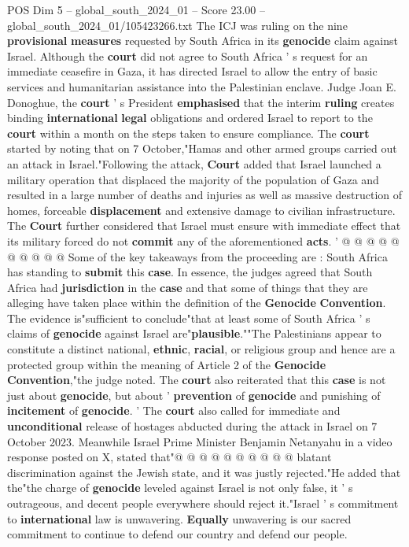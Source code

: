 \begin{textsample}{POS Dim 5 – global\_south\_2024\_01 – Score 23.00 – global\_south\_2024\_01/105423266.txt}  \label{ex:f5_pos_001}
The ICJ was ruling on the nine \textbf{provisional} \textbf{measures} requested by South Africa in its \textbf{genocide} claim against Israel.
Although the \textbf{court} did not agree to South Africa ' s request for an immediate ceasefire in Gaza, it has directed Israel to allow the entry of basic services and humanitarian assistance into the Palestinian enclave.
Judge Joan E.
Donoghue, the \textbf{court} ' s President \textbf{emphasised} that the interim \textbf{ruling} creates binding \textbf{international} \textbf{legal} obligations and ordered Israel to report to the \textbf{court} within a month on the steps taken to ensure compliance.
The \textbf{court} started by noting that on 7 October,"Hamas and other armed groups carried out an attack in Israel."Following the attack, \textbf{Court} added that Israel launched a military operation that displaced the majority of the population of Gaza and resulted in a large number of deaths and injuries as well as massive destruction of homes, forceable \textbf{displacement} and extensive damage to civilian infrastructure.
The \textbf{Court} further considered that Israel must ensure with immediate effect that its military forced do not \textbf{commit} any of the aforementioned \textbf{acts}. ' @ @ @ @ @ @ @ @ @ @ Some of the key takeaways from the proceeding are : South Africa has standing to \textbf{submit} this \textbf{case}.
In essence, the judges agreed that South Africa had \textbf{jurisdiction} in the \textbf{case} and that some of things that they are alleging have taken place within the definition of the \textbf{Genocide} \textbf{Convention}.
The evidence is"sufficient to conclude"that at least some of South Africa ' s claims of \textbf{genocide} against Israel are"\textbf{plausible}.""The Palestinians appear to constitute a distinct national, \textbf{ethnic}, \textbf{racial}, or religious group and hence are a protected group within the meaning of Article 2 of the \textbf{Genocide} \textbf{Convention},"the judge noted.
The \textbf{court} also reiterated that this \textbf{case} is not just about \textbf{genocide}, but about ' \textbf{prevention} of \textbf{genocide} and punishing of \textbf{incitement} of \textbf{genocide}. ' The \textbf{court} also called for immediate and \textbf{unconditional} release of hostages abducted during the attack in Israel on 7 October 2023.
Meanwhile Israel Prime Minister Benjamin Netanyahu in a video response posted on X, stated that"@ @ @ @ @ @ @ @ @ @ blatant discrimination against the Jewish state, and it was justly rejected."He added that the"the charge of \textbf{genocide} leveled against Israel is not only false, it ' s outrageous, and decent people everywhere should reject it."Israel ' s commitment to \textbf{international} law is unwavering. \textbf{Equally} unwavering is our sacred commitment to continue to defend our country and defend our people.

\end{textsample}
